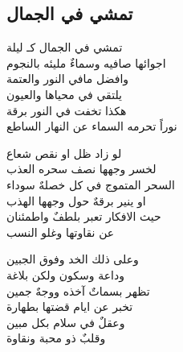 \documentclass[12pt, a4paper]{article}
\begin{document}
\begin{otherlanguage}{arabic}

\begin{center}
  

  \section*{تمشي في الجمال }\vspace{1cm}

تمشي في الجمال كـ ليلة \\
اجوائها صافيه وسماءٌ مليئه بالنجوم \\
وافضل مافي النور والعتمة \\
يلتقي في محياها والعيون \\
هكذا تخفت في النور برقة \\ 
نوراً تحرمه السماء عن النهار الساطع \vspace{1cm}


لو زاد ظل او نقص شعاع \\ 
لخسر وجهها نصف سحره العذب \\ 
السحر المتموج في كل خصلهٌ سوداء \\ 
او ينير برقهٌ حول وجهها الهذب \\ 
حيث الافكار تعبر بلطفٌ  واطمئنان \\ 
عن نقاوتها وغلو النسب \vspace{1cm}


وعلى ذلك الخد وفوق الجبين \\
وداعة وسكون ولكن بلاغة \\
تظهر بسماتٌ آخذه ووجهٌ جمين \\
تخبر عن ايام قضتها بطهارة \\
وعقلٌ في سلام بكل مبين \\
وقلبٌ ذو محبة ونقاوة 



\end{center}


\end{otherlanguage}


  
\end{document}
